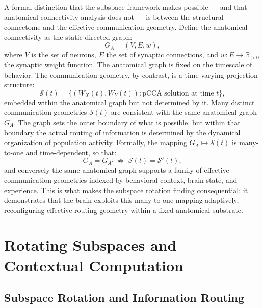 \documentclass[12pt, a4paper, openany]{book}
\theoremstyle{definition}
\theoremstyle{remark}
\begin{document}
A formal distinction that the subspace framework makes possible — and that anatomical connectivity analysis does not — is between the structural connectome and the effective communication geometry. Define the anatomical connectivity as the static directed graph:
\begin{equation}
G_A = (V, E, w),
\end{equation}
where $V$ is the set of neurons, $E$ the set of synaptic connections, and $w : E \to \mathbb{R}_{>0}$ the synaptic weight function. The anatomical graph is fixed on the timescale of behavior. The communication geometry, by contrast, is a time-varying projection structure:
\begin{equation}
\mathcal{S}(t) = \{(W_X(t), W_Y(t)) : \text{pCCA solution at time } t\},
\end{equation}
embedded within the anatomical graph but not determined by it. Many distinct communication geometries $\mathcal{S}(t)$ are consistent with the same anatomical graph $G_A$. The graph sets the outer boundary of what is possible, but within that boundary the actual routing of information is determined by the dynamical organization of population activity. Formally, the mapping $G_A \mapsto \mathcal{S}(t)$ is many-to-one and time-dependent, so that:
\begin{equation}
G_A = G_{A'} \;\not\Rightarrow\; \mathcal{S}(t) = \mathcal{S}'(t),
\end{equation}
and conversely the same anatomical graph supports a family of effective communication geometries indexed by behavioral context, brain state, and experience. This is what makes the subspace rotation finding consequential: it demonstrates that the brain exploits this many-to-one mapping adaptively, reconfiguring effective routing geometry within a fixed anatomical substrate.


\chapter{Rotating Subspaces and Contextual Computation}

\section{Subspace Rotation and Information Routing}
\end{document}
